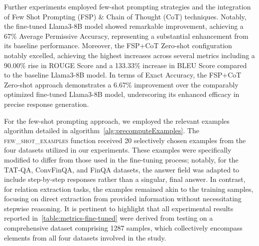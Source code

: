 \documentclass[logo,msc]{infthesis}           %
\begin{document}
Further experiments employed few-shot prompting strategies and the integration of Few Shot Prompting (FSP) \& Chain of Thought (CoT) techniques. Notably, the fine-tuned Llama3-8B model showed remarkable improvement, achieving a 67\% Average Permissive Accuracy, representing a substantial enhancement from its baseline performance. Moreover, the FSP+CoT Zero-shot configuration notably excelled, achieving the highest increases across several metrics including a 90.00\% rise in ROUGE Score and a 133.33\% increase in BLEU Score compared to the baseline Llama3-8B model. In terms of Exact Accuracy, the FSP+CoT Zero-shot approach demonstrates a 6.67\% improvement over the comparably optimized fine-tuned Llama3-8B model, underscoring its enhanced efficacy in precise response generation. 

For the few-shot prompting approach, we employed the relevant examples algorithm detailed in algorithm~\ref{alg:precomputeExamples}. The \textsc{few\_shot\_examples} function received 20 selectively chosen examples from the four datasets utilized in our experiments. These examples were specifically modified to differ from those used in the fine-tuning process; notably, for the TAT-QA, ConvFinQA, and FinQA datasets, the answer field was adapted to include step-by-step responses rather than a singular, final answer. In contrast, for relation extraction tasks, the examples remained akin to the training samples, focusing on direct extraction from provided information without necessitating stepwise reasoning. It is pertinent to highlight that all experimental results reported in~\ref{table:metrics-fine-tuned} were derived from testing on a comprehensive dataset comprising 1287 samples, which collectively encompass elements from all four datasets involved in the study.
\end{document}
